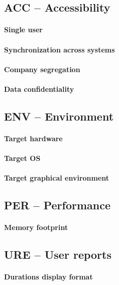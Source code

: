 \subsection{ACC -- Accessibility}
\paragraph{Single user}
\paragraph{Synchronization across systems}
\paragraph{Company segregation}
\paragraph{Data confidentiality}

\subsection{ENV -- Environment}
\paragraph{Target hardware}
\paragraph{Target OS}
\paragraph{Target graphical environment}

\subsection{PER -- Performance}
\paragraph{Memory footprint}

\subsection{URE -- User reports}
\paragraph{Durations display format}

